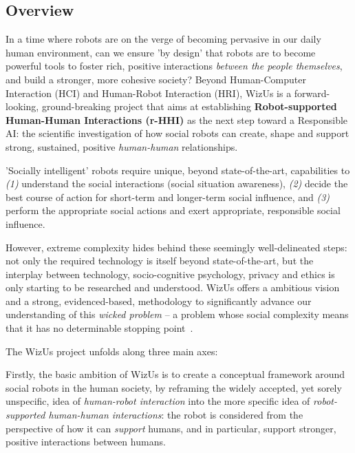 \documentclass[11pt]{report}
\newcommand{\project}{WizUs\xspace}
\begin{document}
\subsection{Overview}

In a time where robots are on the verge of becoming pervasive in our daily human
environment, can we ensure 'by design' that robots are to become powerful tools
to foster rich, positive interactions \emph{between the people themselves}, and
build a stronger, more cohesive society? Beyond Human-Computer Interaction (HCI)
and Human-Robot Interaction (HRI), \project is a forward-looking,
ground-breaking project that aims at establishing \textbf{Robot-supported
Human-Human Interactions (r-HHI)} as the next step toward a Responsible AI: the
scientific investigation of how social robots can create, shape and support
strong, sustained, positive \emph{human-human} relationships.

'Socially intelligent' robots require unique, beyond state-of-the-art,
capabilities to \emph{(1)} understand the social interactions (social
situation awareness), \emph{(2)} decide the best course of action for
short-term and longer-term social influence, and \emph{(3)} perform the
appropriate social actions and exert appropriate, responsible social influence.

However, extreme complexity hides behind these seemingly well-delineated steps:
not only the required technology is itself beyond state-of-the-art, but the
interplay between technology, socio-cognitive psychology, privacy and ethics is
only starting to be researched and understood. \project offers a ambitious
vision and a strong, evidenced-based, methodology to significantly advance our
understanding of this \emph{wicked problem} -- a problem whose social complexity
means that it has no determinable stopping point~\cite{tonkinwise2015design}.

The \project project unfolds along three main axes:

Firstly, the basic ambition of \project is to create a conceptual
framework around social robots in the human society, by reframing the widely
accepted, yet sorely unspecific, idea of \emph{human-robot interaction} into the
more specific idea of \emph{robot-supported human-human interactions}: the robot
is considered from the perspective of how it can \emph{support} humans, and in
particular, support stronger, positive interactions between humans.
\end{document}

